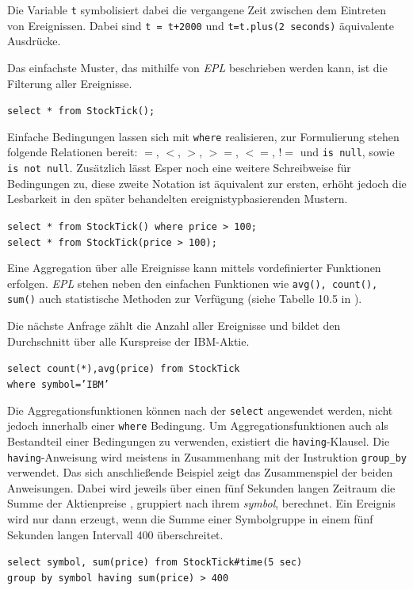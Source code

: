 \documentclass{acm_proc_article-sp}
\begin{document}
Die Variable \texttt{t} symbolisiert dabei die vergangene Zeit zwischen dem Eintreten von 
Ereignissen. Dabei sind \texttt{t = t+2000} und \texttt{t=t.plus(2 seconds)} äquivalente 
Ausdrücke. 

Das einfachste Muster, das mithilfe von \textit{EPL} beschrieben werden kann, ist die 
Filterung aller Ereignisse.

\texttt{select * from StockTick();}

Einfache Bedingungen lassen sich mit \texttt{where} realisieren, zur Formulierung stehen 
folgende Relationen bereit: $=$, $<$, $>$, $>=$, $<=$, $!=$ und  \texttt{is null}, sowie 
\texttt{is not null}. Zusätzlich lässt Esper 
noch eine weitere Schreibweise für Bedingungen zu, diese zweite Notation ist 
äquivalent zur ersten, erhöht jedoch die Lesbarkeit in den später behandelten 
ereignistypbasierenden Mustern.

\texttt{select * from StockTick() where price > 100;}\\
\texttt{select * from StockTick(price > 100);}


Eine Aggregation über alle Ereignisse kann mittels vordefinierter Funktionen erfolgen. 
\textit{EPL} 
stehen neben den einfachen Funktionen wie \texttt{avg(), count(), sum()} auch 
statistische Methoden zur Verfügung (siehe Tabelle 10.5 in \cite{esper-reference}).

Die nächste Anfrage zählt die Anzahl aller Ereignisse und bildet den Durchschnitt über 
alle Kurspreise der IBM-Aktie.

\texttt{select  count(*),avg(price) from StockTick\\where symbol='IBM'}


Die Aggregationsfunktionen können nach der \texttt{select} angewendet werden, 
nicht jedoch innerhalb einer \texttt{where} Bedingung. Um Aggregationsfunktionen auch 
als Bestandteil einer Bedingungen zu verwenden, existiert die \texttt{having}-Klausel.
Die \texttt{having}-Anweisung wird meistens in Zusammenhang mit der Instruktion 
\texttt{group\_by} verwendet. Das sich anschließende Beispiel zeigt das Zusammenspiel der 
beiden Anweisungen. Dabei wird jeweils über einen fünf Sekunden langen Zeitraum die Summe 
der Aktienpreise , gruppiert nach ihrem \emph{symbol}, berechnet. Ein Ereignis wird nur 
dann erzeugt, wenn die Summe einer Symbolgruppe in einem fünf Sekunden langen Intervall 
400 
überschreitet.

\texttt{select symbol, sum(price) 
from StockTick\#time(5 sec)\\
group by symbol
having sum(price) > 400}
 
\end{document}
